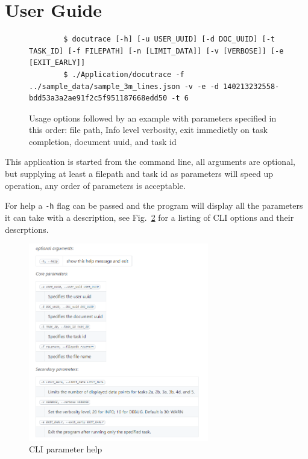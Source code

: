 \documentclass[11pt]{article}
\newcommand{\code}[1]{\colorbox{light-gray}{\texttt{#1}}}
\begin{document}
\section{User Guide}

\begin{figure}[h]
    \begin{verbatim}
        $ docutrace [-h] [-u USER_UUID] [-d DOC_UUID] [-t TASK_ID] [-f FILEPATH] [-n [LIMIT_DATA]] [-v [VERBOSE]] [-e [EXIT_EARLY]]
        $ ./Application/docutrace -f ../sample_data/sample_3m_lines.json -v -e -d 140213232558-bdd53a3a2ae91f2c5f951187668edd50 -t 6
    \end{verbatim}
    \caption{Usage options followed by an example with parameters specified in this order: file path, Info level verbosity, exit immedietly on task completion, document uuid, and task id}
    \label{fig:CLIOpts}
\end{figure}

This application is started from the command line, all arguments are optional, but supplying at least a filepath and task id as parameters will speed up operation, any order of parameters is acceptable. 

For help a \code{-h} flag can be passed and the program will display all the parameters it can take with a description, see Fig.~\ref{fig:CLIhelp} for a listing of CLI options and their descrptions.


\begin{figure}[H]
    \centering
    \includegraphics[width=0.7\textwidth]{CLlhelp.png}
    \caption{CLI parameter help}
    \label{fig:CLIhelp}
\end{figure}
\end{document}
